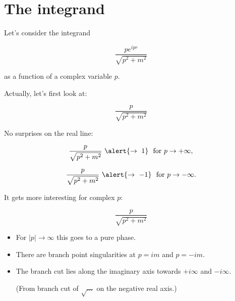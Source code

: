 \documentclass[aspectratio=169]{beamer}
\newcommand{\sqrtpm}{\sqrt{p^2 + m^2}}
\newcommand{\envelope}{\frac{p}{\sqrtpm}}
\newcommand{\integrand}{\frac{p e^{ipr}}{\sqrt{p^2 + m^2}}}
\begin{document}
\section{The integrand}

\begin{frame}
Let's consider the integrand

$$\integrand$$

\pause
as a function of a \alert{complex} variable $p$.
\end{frame}


\begin{frame}
Actually, let's first look at:

\pause
$$\envelope$$

\pause
No surprises on the real line:

\pause
$$\envelope \ \alert{\rightarrow \ 1} \ \textrm{ for } p \rightarrow +\infty,$$

\pause
$$\envelope \ \alert{\rightarrow \ -1} \ \textrm{ for } p \rightarrow -\infty.$$

\end{frame}





\begin{frame}
It gets more interesting for complex $p$:

\pause
$$\envelope$$

\begin{itemize}

\pause
\item For $|p| \rightarrow \infty$ this goes to  a pure phase.

\pause
\item There are branch point \alert{singularities} at $p = im$ and $p = -im$.

\pause
\item The \alert{branch cut} lies along the imaginary axis towards $+i\infty$ and $-i\infty$.
\pause

(From branch cut of $\sqrt{\ldots}$ on the negative real axis.)
\end{itemize}
\end{frame}
\end{document}
